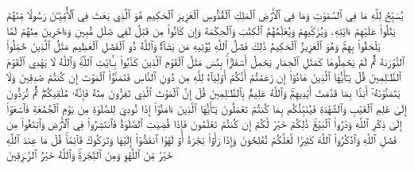 يُسَبِّحُ لِلَّهِ مَا فِي ٱلسَّمَٰوَٰتِ وَمَا فِي ٱلۡأَرۡضِ ٱلۡمَلِكِ ٱلۡقُدُّوسِ ٱلۡعَزِيزِ ٱلۡحَكِيمِ
هُوَ ٱلَّذِي بَعَثَ فِي ٱلۡأُمِّيِّـۧنَ رَسُولٗا مِّنۡهُمۡ يَتۡلُواْ عَلَيۡهِمۡ ءَايَٰتِهِۦ وَيُزَكِّيهِمۡ وَيُعَلِّمُهُمُ ٱلۡكِتَٰبَ وَٱلۡحِكۡمَةَ وَإِن كَانُواْ مِن قَبۡلُ لَفِي ضَلَٰلٖ مُّبِينٖ
وَءَاخَرِينَ مِنۡهُمۡ لَمَّا يَلۡحَقُواْ بِهِمۡۚ وَهُوَ ٱلۡعَزِيزُ ٱلۡحَكِيمُ
ذَٰلِكَ فَضۡلُ ٱللَّهِ يُؤۡتِيهِ مَن يَشَآءُۚ وَٱللَّهُ ذُو ٱلۡفَضۡلِ ٱلۡعَظِيمِ
مَثَلُ ٱلَّذِينَ حُمِّلُواْ ٱلتَّوۡرَىٰةَ ثُمَّ لَمۡ يَحۡمِلُوهَا كَمَثَلِ ٱلۡحِمَارِ يَحۡمِلُ أَسۡفَارَۢاۚ بِئۡسَ مَثَلُ ٱلۡقَوۡمِ ٱلَّذِينَ كَذَّبُواْ بِـَٔايَٰتِ ٱللَّهِۚ وَٱللَّهُ لَا يَهۡدِي ٱلۡقَوۡمَ ٱلظَّـٰلِمِينَ
قُلۡ يَـٰٓأَيُّهَا ٱلَّذِينَ هَادُوٓاْ إِن زَعَمۡتُمۡ أَنَّكُمۡ أَوۡلِيَآءُ لِلَّهِ مِن دُونِ ٱلنَّاسِ فَتَمَنَّوُاْ ٱلۡمَوۡتَ إِن كُنتُمۡ صَٰدِقِينَ
وَلَا يَتَمَنَّوۡنَهُۥٓ أَبَدَۢا بِمَا قَدَّمَتۡ أَيۡدِيهِمۡۚ وَٱللَّهُ عَلِيمُۢ بِٱلظَّـٰلِمِينَ
قُلۡ إِنَّ ٱلۡمَوۡتَ ٱلَّذِي تَفِرُّونَ مِنۡهُ فَإِنَّهُۥ مُلَٰقِيكُمۡۖ ثُمَّ تُرَدُّونَ إِلَىٰ عَٰلِمِ ٱلۡغَيۡبِ وَٱلشَّهَٰدَةِ فَيُنَبِّئُكُم بِمَا كُنتُمۡ تَعۡمَلُونَ
يَـٰٓأَيُّهَا ٱلَّذِينَ ءَامَنُوٓاْ إِذَا نُودِيَ لِلصَّلَوٰةِ مِن يَوۡمِ ٱلۡجُمُعَةِ فَٱسۡعَوۡاْ إِلَىٰ ذِكۡرِ ٱللَّهِ وَذَرُواْ ٱلۡبَيۡعَۚ ذَٰلِكُمۡ خَيۡرٞ لَّكُمۡ إِن كُنتُمۡ تَعۡلَمُونَ
فَإِذَا قُضِيَتِ ٱلصَّلَوٰةُ فَٱنتَشِرُواْ فِي ٱلۡأَرۡضِ وَٱبۡتَغُواْ مِن فَضۡلِ ٱللَّهِ وَٱذۡكُرُواْ ٱللَّهَ كَثِيرٗا لَّعَلَّكُمۡ تُفۡلِحُونَ
وَإِذَا رَأَوۡاْ تِجَٰرَةً أَوۡ لَهۡوًا ٱنفَضُّوٓاْ إِلَيۡهَا وَتَرَكُوكَ قَآئِمٗاۚ قُلۡ مَا عِندَ ٱللَّهِ خَيۡرٞ مِّنَ ٱللَّهۡوِ وَمِنَ ٱلتِّجَٰرَةِۚ وَٱللَّهُ خَيۡرُ ٱلرَّـٰزِقِينَ